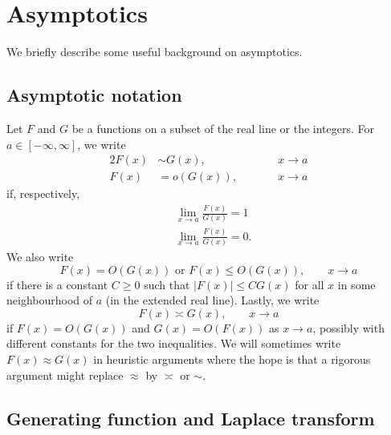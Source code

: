 
\section{Asymptotics}
\label{sec:asymp}

We briefly describe some useful background on asymptotics.


\subsection{Asymptotic notation}

Let $F$ and $G$ be a functions on a subset of the real line or the integers.
For $a\in[-\infty,\infty]$, we write
\begin{alignat}{2}
F(x) &\sim G(x), &&\qquad x \to a \\
F(x) &= o(G(x)), &&\qquad x \to a
\end{alignat}
if, respectively,
\begin{align}
&\lim_{x\to a} \frac{F(x)}{G(x)} = 1 \\
&\lim_{x\to a} \frac{F(x)}{G(x)} = 0.
\end{align}
We also write
\begin{equation}
F(x) = O(G(x))
	\text{ or }
F(x) \le O(G(x)),
	\qquad
x \to a
\end{equation}
if there is a constant $C \ge 0$ such that $|F(x)| \le C G(x)$ for all
$x$ in some neighbourhood of $a$ (in the extended real line). Lastly, we write
\begin{equation}
F(x) \asymp G(x),
	\qquad
x \to a
\end{equation}
if $F(x) = O(G(x))$ and $G(x) = O(F(x))$ as $x\to a$, possibly with
different constants for the two inequalities. We will sometimes write
$F(x) \approx G(x)$ in heuristic
arguments where the hope is that a rigorous argument might replace $\approx$
by $\asymp$ or $\sim$.


\subsection{Generating function and Laplace transform}

